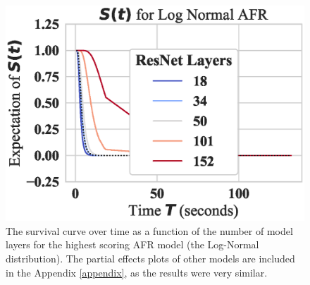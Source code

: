 \begin{figure}
	\centering\includegraphics[width=.5\textwidth]{cifar100/log_normal_layers_partial_effect.eps}
	\caption{The survival curve over time as a function of the number of model layers for the highest scoring AFR model (the Log-Normal distribution). The partial effects plots of other models are included in the Appendix \ref{appendix}, as the results were very similar.}
	\label{fig:layers}
\end{figure}
% 


